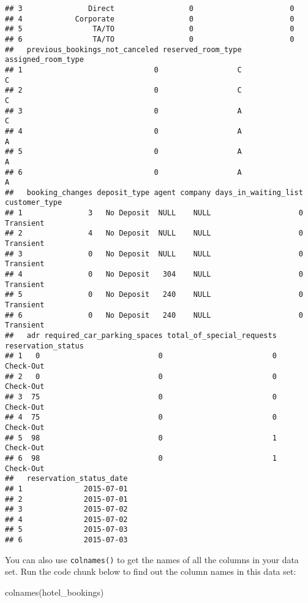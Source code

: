 \documentclass[
]{article}
\newenvironment{Shaded}{\begin{snugshade}}{\end{snugshade}}
\newcommand{\FunctionTok}[1]{\textcolor[rgb]{0.00,0.00,0.00}{#1}}
\newcommand{\NormalTok}[1]{#1}
\begin{document}
\begin{verbatim}
## 3               Direct                 0                      0
## 4            Corporate                 0                      0
## 5                TA/TO                 0                      0
## 6                TA/TO                 0                      0
##   previous_bookings_not_canceled reserved_room_type assigned_room_type
## 1                              0                  C                  C
## 2                              0                  C                  C
## 3                              0                  A                  C
## 4                              0                  A                  A
## 5                              0                  A                  A
## 6                              0                  A                  A
##   booking_changes deposit_type agent company days_in_waiting_list customer_type
## 1               3   No Deposit  NULL    NULL                    0     Transient
## 2               4   No Deposit  NULL    NULL                    0     Transient
## 3               0   No Deposit  NULL    NULL                    0     Transient
## 4               0   No Deposit   304    NULL                    0     Transient
## 5               0   No Deposit   240    NULL                    0     Transient
## 6               0   No Deposit   240    NULL                    0     Transient
##   adr required_car_parking_spaces total_of_special_requests reservation_status
## 1   0                           0                         0          Check-Out
## 2   0                           0                         0          Check-Out
## 3  75                           0                         0          Check-Out
## 4  75                           0                         0          Check-Out
## 5  98                           0                         1          Check-Out
## 6  98                           0                         1          Check-Out
##   reservation_status_date
## 1              2015-07-01
## 2              2015-07-01
## 3              2015-07-02
## 4              2015-07-02
## 5              2015-07-03
## 6              2015-07-03
\end{verbatim}

You can also use \texttt{colnames()} to get the names of all the columns
in your data set. Run the code chunk below to find out the column names
in this data set:

\begin{Shaded}
\begin{Highlighting}[]
\FunctionTok{colnames}\NormalTok{(hotel\_bookings)}
\end{Highlighting}
\end{Shaded}
\end{document}
